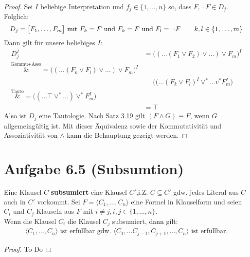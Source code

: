 \documentclass[12pt,a4paper]{article}
\begin{document}
\begin{proof}
Sei $I$ beliebige Interpretation und $f_j\in\lbrace1,\ldots,n\rbrace$ so, dass $F,\neg F\in D_j$. Folglich:
\begin{align*}
D_j=\big[F_1,\ldots,F_m\big]\mit F_k=F\text{ und }F_k=F\text{ und }F_l=\neg F\qquad k,l\in\lbrace1,\ldots,m\rbrace
\end{align*}
Dann gilt für unsere beliebiges $I$:
\begin{align*}
D_j^I&=\big((\ldots(F_1\vee F_2)\vee\ldots)\vee F_m\big)^I\\
\overset{\text{Kommu+Asso}}&=
\big((\ldots(F_k\vee F_l)\vee\ldots)\vee F_m\big)^I\\
&=\big((\ldots(F_k\vee F_l)^I\vee^\ast\ldots v^\ast F_m^I\big)\\
\overset{\text{Tauto}}&=
\big((\ldots\top \vee^\ast\ldots)\vee^\ast F_m^I\big)\\
&=\top
\end{align*}
Also ist $D_j$ eine Tautologie. Nach Satz 3.19 gilt $(F\wedge G)\equiv F$, wenn $G$ allgemeingültig ist. Mit dieser Äquivalenz sowie der Kommutativität und Assoziativität von $\wedge$ kann die Behauptung gezeigt werden.
\end{proof}

\section*{Aufgabe 6.5 (Subsumtion)}
Eine Klausel $C$ \textbf{subsumiert} eine Klausel $C'$,i.Z. $C\subseteq C'$ gdw. jedes Literal aus $C$ auch in $C'$ vorkommt.\nl
Sei $F=\langle C_1,\ldots,C_n\rangle$ eine Formel in Klauselform und seien $C_i$ und  $C_j$ Klauseln aus $F$ mit $i\neq j,i,j\in\lbrace1,\ldots,n\rbrace$.\\
Wenn die Klausel $C_i$ die Klausel $C_j$ subsumiert, dann gilt:
\begin{align*}
\big\langle C_1,\ldots,C_n\big\rangle\text{ ist erfüllbar gdw. }\big\langle C_1,\ldots C_{j-1},C_{j+1},\ldots,C_n\big\rangle\text{ ist erfüllbar.}
\end{align*}
\begin{proof}
To Do
\end{proof}
\end{document}
